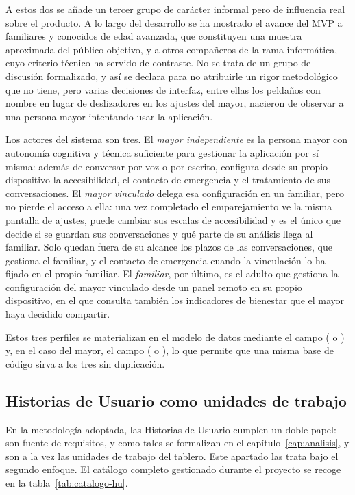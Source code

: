 A estos dos se añade un tercer grupo de carácter informal pero de influencia real sobre el producto. A lo
largo del desarrollo se ha mostrado el avance del MVP a familiares y conocidos de edad avanzada, que
constituyen una muestra aproximada del público objetivo, y a otros compañeros de la rama informática, cuyo
criterio técnico ha servido de contraste. No se trata de un grupo de discusión formalizado, y así se
declara para no atribuirle un rigor metodológico que no tiene, pero varias decisiones de interfaz, entre
ellas los peldaños con nombre en lugar de deslizadores en los ajustes del mayor, nacieron de observar a una
persona mayor intentando usar la aplicación.

Los actores del sistema son tres. El \textit{mayor independiente} es la persona mayor con autonomía
cognitiva y técnica suficiente para gestionar la aplicación por sí misma: además de conversar por voz o
por escrito, configura desde su propio dispositivo la accesibilidad, el contacto de emergencia y el tratamiento de sus
conversaciones. El \textit{mayor vinculado} delega esa configuración en un familiar, pero no pierde el
acceso a ella: una vez completado el emparejamiento ve la misma pantalla de ajustes, puede cambiar sus
escalas de accesibilidad y es el único que decide si se guardan sus conversaciones y qué parte de su
análisis llega al familiar. Solo quedan fuera de su alcance los plazos de las conversaciones, que gestiona
el familiar, y el contacto de emergencia cuando la vinculación lo ha fijado en el propio familiar. El
\textit{familiar}, por último, es el adulto que gestiona la configuración del mayor vinculado desde un
panel remoto en su propio dispositivo, en el que consulta también los indicadores de bienestar que el
mayor haya decidido compartir.

Estos tres perfiles se materializan en el modelo de datos mediante el campo  ( o
) y, en el caso del mayor, el campo  ( o
), lo que permite que una misma base de código sirva a los tres sin duplicación.

\subsection{Historias de Usuario como unidades de trabajo}

En la metodología adoptada, las Historias de Usuario cumplen un doble papel: son fuente de requisitos, y
como tales se formalizan en el capítulo~\ref{cap:analisis}, y son a la vez las unidades de trabajo del
tablero. Este apartado las trata bajo el segundo enfoque. El catálogo completo gestionado durante el
proyecto se recoge en la tabla~\ref{tab:catalogo-hu}.

